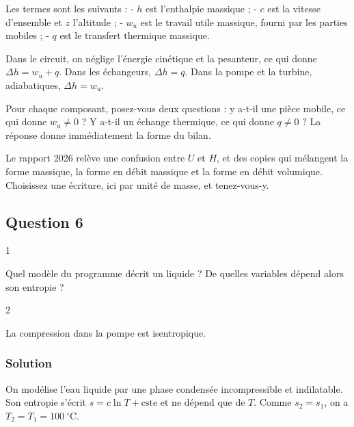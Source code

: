 \documentclass[11pt,a4paper]{article}
\begin{document}
Les termes sont les suivants :
- \(h\) est l'enthalpie massique ;
- \(c\) est la vitesse d'ensemble et \(z\) l'altitude ;
- \(w_u\) est le travail utile massique, fourni par les parties mobiles ;
- \(q\) est le transfert thermique massique.

Dans le circuit, on néglige l'énergie cinétique et la pesanteur, ce qui donne \(\boxed{\Delta h=w_u+q}\). Dans les échangeurs, \(\Delta h=q\). Dans la pompe et la turbine, adiabatiques, \(\Delta h=w_u\).

\begin{methode}

Pour chaque composant, posez-vous deux questions : y a-t-il une pièce mobile, ce qui donne \(w_u\ne0\) ? Y a-t-il un échange thermique, ce qui donne \(q\ne0\) ? La réponse donne immédiatement la forme du bilan.

\end{methode}

\begin{piege}

Le rapport 2026 relève une confusion entre \(U\) et \(H\), et des copies qui mélangent la forme massique, la forme en débit massique et la forme en débit volumique. Choisissez une écriture, ici par unité de masse, et tenez-vous-y.

\end{piege}

\hypertarget{question-6}{%
\subsection{Question 6}\label{question-6}}

\begin{indication}{1}

Quel modèle du programme décrit un liquide ? De quelles variables dépend alors son entropie ?

\end{indication}

\begin{indication}{2}

La compression dans la pompe est isentropique.

\end{indication}

\hypertarget{solution-5}{%
\subsubsection{Solution}\label{solution-5}}

On modélise l'eau liquide par une phase condensée incompressible et indilatable. Son entropie s'écrit \(s=c\ln T+\text{cste}\) et ne dépend que de \(T\). Comme \(s_2=s_1\), on a \(\boxed{T_2=T_1=100\ ^\circ\text{C}}\).
\end{document}
